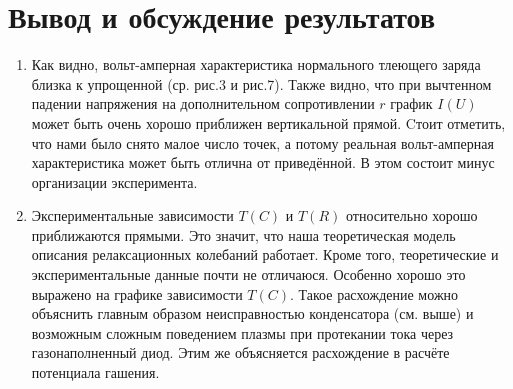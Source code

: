 \documentclass[a4paper,12pt]{article} %
\begin{document}
\section{Вывод и обсуждение результатов}

\begin{enumerate}
    \item Как видно, вольт-амперная характеристика нормального тлеющего заряда близка к упрощенной (ср. рис.3 и рис.7). Также видно, что при вычтенном падении напряжения на дополнительном сопротивлении $r$ график $I(U)$ может быть очень хорошо приближен вертикальной прямой. Cтоит отметить, что нами было снято малое число точек, а потому реальная вольт-амперная характеристика может быть отлична от приведённой. В этом состоит минус организации эксперимента.
    \item Экспериментальные зависимости $T(C)$ и $T(R)$ относительно хорошо приближаются прямыми. Это значит, что наша теоретическая модель описания релаксационных колебаний работает. Кроме того, теоретические и экспериментальные данные почти не отличаюся. Особенно хорошо это выражено на графике зависимости $T(C)$. Такое расхождение можно объяснить главным образом неисправностью конденсатора (см. выше) и возможным сложным поведением плазмы при протекании тока через газонаполненный диод. Этим же объясняется расхождение в расчёте потенциала гашения.
\end{enumerate}
\end{document}
